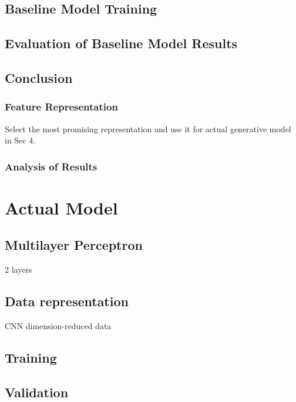 \documentclass[11pt, a4paper]{report}
\theoremstyle{definition}
\begin{document}
\section{Baseline Model Training}

\section{Evaluation of Baseline Model Results}

\section{Conclusion}
\subsection{Feature Representation}
Select the most promising representation and use it for actual generative model in Sec 4.

\subsection{Analysis of Results}

\chapter{Actual Model}
\label{chap:5}

\section{Multilayer Perceptron}
2 layers

\section{Data representation}
CNN dimension-reduced data

\section{Training}

\section{Validation}
\end{document}
